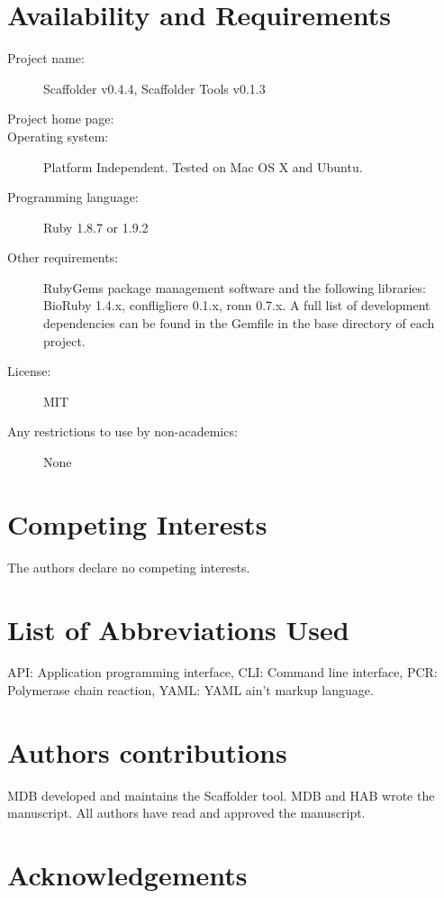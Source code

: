 \documentclass[10pt]{bmc_article}
\newenvironment{bmcformat}{\begin{raggedright}\baselineskip20pt\sloppy\setboolean{publ}{false}}{\end{raggedright}\baselineskip20pt\sloppy}
\begin{document}
\begin{bmcformat}
\clearpage

\section*{Availability and Requirements} %

  \begin{description}
    \item[Project name:] Scaffolder v0.4.4, Scaffolder Tools
    v0.1.3
    \item[Project home page:] \scaffolder
    \item[Operating system:] Platform Independent. Tested on Mac OS X and
    Ubuntu.
    \item[Programming language:] Ruby 1.8.7 or 1.9.2
    \item[Other requirements:] RubyGems package management
    software and the following libraries: BioRuby 1.4.x, confligliere
    0.1.x, ronn 0.7.x. A full list of development dependencies can be found in
    the Gemfile in the base directory of each project.
    \item[License:] MIT \item[Any restrictions to use by non-academics:] None
    \end{description}

\clearpage

\section*{Competing Interests} %

The authors declare no competing interests.

\section*{List of Abbreviations Used} %

API: Application programming interface, CLI: Command line interface, PCR:
Polymerase chain reaction, YAML: YAML ain't markup language\cite{yaml}.

\section*{Authors contributions} %

MDB developed and maintains the Scaffolder tool. MDB and HAB wrote the
manuscript. All authors have read and approved the manuscript.

\section*{Acknowledgements} %


\end{bmcformat}
\end{document}
